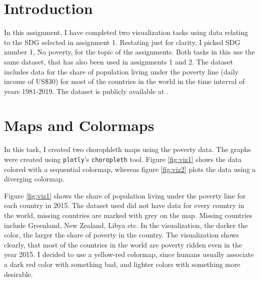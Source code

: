 \documentclass[11pt,a4paper,titlepage]{article}
\begin{document}



\section*{Introduction}
In this assignment, I have completed two visualization tasks using data relating to the SDG selected in assignment 1. Restating just for clarity, I picked SDG number 1, No poverty, for the topic of the assignments. Both tasks in this use the same dataset, that has also been used in assignments 1 and 2. The dataset includes data for the share of population living under the poverty line (daily income of US\$30) for most of the countries in the world in the time interval of years 1981-2019. The dataset is publicly available at \cite{data}.

\section{Maps and Colormaps}

In this task, I created two chorophleth maps using the poverty data. The graphs were created using \texttt{plotly}'s \texttt{choropleth} tool. Figure \ref{fig:viz1} shows the data colored with a sequential colormap, whereas figure \ref{fig:viz2} plots the data using a diverging colormap.

Figure \ref{fig:viz1} shows the share of population living under the poverty line for each country in 2015. The dataset used did not have data for every country in the world, missing countries are marked with grey on the map. Missing countries include Greenland, New Zealand, Libya etc. In the visualization, the darker the color, the larger the share of poverty in the country. The visualization shows clearly, that most of the countries in the world are poverty ridden even in the year 2015. I decided to use a yellow-red colormap, since humans usually associate a dark red color with something bad, and lighter colors with something more desirable.
\end{document}

